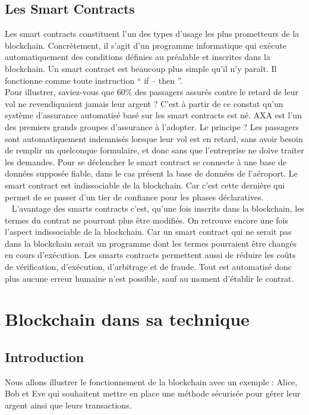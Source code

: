 \documentclass[12pt, a4paper, oneside]{book}
\begin{document}
    \section{Les Smart Contracts}
    Les smart contracts constituent l’un des types d’usage les plus prometteurs de la blockchain. Concrètement, il s’agit d’un programme informatique qui exécute automatiquement des conditions définies au préalable et inscrites dans la blockchain. Un smart contract est beaucoup plus simple qu’il n’y paraît. Il fonctionne comme toute instruction \hyphenquote{french}{ if – then }. 
    \\
    \indent
    Pour illustrer, saviez-vous que 60\% des passagers assurés contre le retard de leur vol ne revendiquaient jamais leur argent ? C’est à partir de ce constat qu’un système d’assurance automatisé basé sur les smart contracts est né. AXA est l’un des premiers grands groupes d’assurance à l’adopter. Le principe ? Les passagers sont automatiquement indemnisés lorsque leur vol est en retard, sans avoir besoin de remplir un quelconque formulaire, et donc sans que l’entreprise ne doive traiter les demandes. Pour se déclencher le smart contract se connecte à une base de données supposée fiable, dans le cas présent la base de données de l’aéroport.
    Le smart contract est indissociable de la blockchain. Car c’est cette dernière qui permet de se passer d’un tier de confiance pour les phases déclaratives.
    \\
    \indent~
    L’avantage des smarts contracts c’est, qu’une fois inscrits dans la blockchain, les termes du contrat ne pourront plus être modifiés. On retrouve encore une fois l’aspect indissociable de la blockchain. Car un smart contract qui ne serait pas dans la blockchain serait un programme dont les termes pourraient être changés en cours d’exécution.
    Les smarts contracts permettent aussi de réduire les coûts de vérification, d’exécution, d’arbitrage et de fraude. Tout est automatisé donc plus aucune erreur humaine n’est possible, sauf au moment d’établir le contrat.


    \chapter{Blockchain dans sa technique}
    \section{Introduction}
    Nous allons illustrer le fonctionnement de la blockchain avec un exemple : Alice, Bob et Eve qui souhaitent mettre en place une méthode sécurisée pour gérer leur argent ainsi que leurs transactions.
\end{document}
